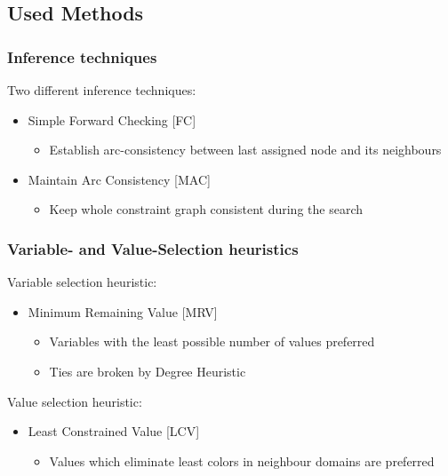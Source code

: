 \documentclass{beamer}
\begin{document}
\subsection{Used Methods}
\begin{frame}
    \frametitle{Inference techniques}
	Two different inference techniques:
	\begin{itemize}
	\item{Simple Forward Checking [FC]}	
		\begin{itemize}	
		\item{Establish arc-consistency between last assigned node and its neighbours}
		\end{itemize}
	\item{Maintain Arc Consistency [MAC]}
	\begin{itemize}	
		\item{Keep whole constraint graph consistent during the search}
		\end{itemize}
	\end{itemize}

  \end{frame}

\begin{frame}
    \frametitle{Variable- and Value-Selection heuristics}
	Variable selection heuristic:
	\begin{itemize}
	\item{Minimum Remaining Value [MRV]}
          \begin{itemize}
          \item{Variables with the least possible number of values preferred}
          \item{Ties are broken by Degree Heuristic}
          \end{itemize}
	\end{itemize}
	Value selection heuristic:
	\begin{itemize}
	\item{Least Constrained Value [LCV]}
          \begin{itemize}
          \item{Values which eliminate least colors in neighbour domains are preferred}
          \end{itemize}
          
	\end{itemize}
  \end{frame}
\end{document}
